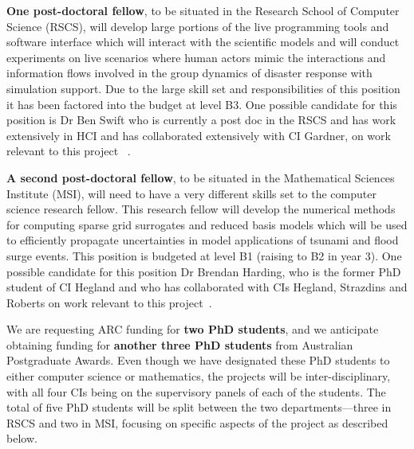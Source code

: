 \iffalse
Both  Dr Debusschere and Dr Jakeman
have offered to host visits from our group to the Livermore and
Albuquerque Sandia Laboratories. We plan to support reciprocal visits
to ANU.
\fi

{\bf One post-doctoral fellow}, to be situated in the Research School
of Computer Science (RSCS), will develop large portions of the live
programming tools and software interface which will interact with the
scientific models and will conduct experiments on live scenarios where
human actors mimic the interactions and information flows involved in
the group dynamics of disaster response with simulation support. Due
to the large skill set and responsibilities of this position it has
been factored into the budget at level B3.  One possible candidate for
this position is Dr Ben Swift who is currently a post doc in the RSCS
and has work extensively in HCI and has collaborated extensively with
CI Gardner, on work relevant to this project
~\parencite{martin2015tracking,martin2016intelligent,swiftLive2016,
  swift2013visual,swift2014coding}.

{\bf A second post-doctoral fellow}, to be situated in the
Mathematical Sciences Institute (MSI), will need to have a very
different skills set to the computer science research fellow. This
research fellow will develop the numerical methods for computing
sparse grid surrogates and reduced basis models which will be used to
efficiently propagate uncertainties in model applications of tsunami
and flood surge events. This position is budgeted at level B1 (raising
to B2 in year 3).  One possible candidate for this position Dr Brendan Harding, who 
is the former PhD student of CI Hegland and who has
collaborated with CIs Hegland, Strazdins and Roberts on work
relevant to this project~\parencite{Ali11022016, AliEtal2015,
  deBaarHarding2015, HardingHLS2015, sgctalg15}.


We are requesting ARC funding for {\bf two PhD students}, and we anticipate
obtaining funding for {\bf another three PhD students} from Australian Postgraduate
Awards. Even though we have designated these PhD students to either
computer science or mathematics, the projects will be
inter-disciplinary, with all four CIs being on the supervisory panels
of each of the students. The {total of five PhD students} will be split between
the two departments—three in RSCS and two in MSI, focusing on specific
aspects of the project as described below.

\iffalse
. In RSCS, these will be the dynamic distributed
computing infrastructure and the development of live interfaces for
data visualisation. In the MSI, these will be the uncertainty
quantification and the development of numerical methods for the sparse
grid technique, and the reduced basis method, applied to our
inundation model example. 
\fi

